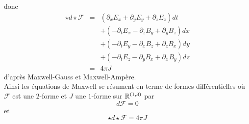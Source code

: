 \documentclass[12pt, a4paper]{book}
\begin{document}
donc 
\begin{eqnarray*}
\star d\star \mathscr{F} &=& (\partial_x E_x + \partial_y E_y + \partial_z E_z)dt \\
& & +(-\partial_t E_x - \partial_z B_y + \partial_y B_z) dx \\
& & +(-\partial_t E_y - \partial_x B_z + \partial_z B_x) dy \\
& & +(-\partial_t E_z - \partial_y B_x + \partial_x B_y) dz \\
&=& 4\pi J
\end{eqnarray*}
d'après Maxwell-Gauss et Maxwell-Ampère. \\

Ainsi les équations de Maxwell se résument en terme de formes différentielles où $\mathscr{F}$ est une $2$-forme et $J$ une $1$-forme sur $\mathbb{R}^{(1,3)}$ par 
$$d\mathscr{F} = 0$$
et
$$\star d\star \mathscr{F} = 4\pi J$$

\nocite{sontz2015principal}



\end{document}
